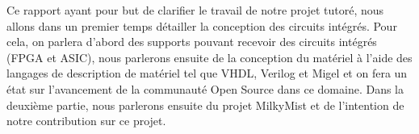Ce rapport ayant pour but de clarifier le travail de notre projet tutoré, nous allons
dans un premier temps détailler la conception des circuits intégrés.  Pour cela, on
parlera d'abord des supports pouvant recevoir des circuits intégrés (FPGA et ASIC),
nous parlerons ensuite de la conception du matériel à l'aide des langages de
description de matériel tel que VHDL, Verilog et Migel et on fera un état sur
l'avancement de la communauté Open Source dans ce domaine.  Dans la deuxième partie,
nous parlerons ensuite du projet MilkyMist et de l'intention de notre contribution
sur ce projet.
